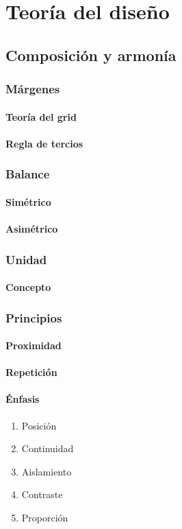 \documentclass[12pt]{report}
\begin{document}
	\section{Teoría del diseño}
		\subsection{Composición y armonía}
			\subsubsection{Márgenes}
				\paragraph{Teoría del grid}
				\paragraph{Regla de tercios}
			\subsubsection{Balance}
				\paragraph{Simétrico}
				\paragraph{Asimétrico}
			\subsubsection{Unidad}
				\paragraph{Concepto}
			\subsubsection{Principios}
				\paragraph{Proximidad}
				\paragraph{Repetición}
				\paragraph{Énfasis}
					\begin{enumerate}
						\item Posición
						\item Continuidad
						\item Aislamiento
						\item Contraste
						\item Proporción
					\end{enumerate}
\end{document}
